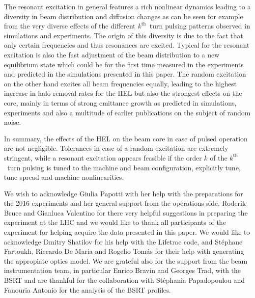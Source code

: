 \documentclass[%
 reprint,
 amsmath,amssymb,
 aps,
prstab,
]{revtex4-1}
\begin{document}
The resonant excitation in general features a rich nonlinear dynamics leading to a diversity in beam distribution and diffusion changes as can be seen for example from the very diverse effects of the different $k^{\mathrm{th}}$~turn pulsing patterns observed in simulations and experiments. The origin of this diversity is due to the fact that only certain frequencies and thus resonances are excited. Typical for the resonant excitation is also the fast adjustment of the beam distribution to a new equilibrium state which could be for the first time measured in the experiments and predicted in the simulations presented in this paper. The random excitation on the other hand excites all beam frequencies equally, leading to the highest increase in halo removal rates for the HEL \cite{hel_halo_hllhc_fitterer} but also the strongest effects on the core, mainly in terms of strong emittance growth as predicted in simulations, experiments and also a multitude of earlier publications on the subject of random noise.

In summary, the effects of the HEL on the beam core in case of pulsed operation are not negligible. Tolerances in case of a random excitation are extremely stringent, while a resonant excitation appears feasible if the order $k$ of the $k^{\mathrm{th}}$~turn pulsing is tuned to the machine and beam configuration, explicitly tune, tune spread and machine nonlinearities.

\begin{acknowledgments}
We wish to acknowledge Giulia Papotti with her help with the preparations for the 2016 experiments and her general support from the operations side, Roderik Bruce and Gianluca Valentino for there very helpful suggestions in preparing the experiment at the LHC and we would like to thank all participants of the experiment for helping acquire the data presented in this paper. We would like to acknowledge Dmitry Shatilov for his help with the Lifetrac code, and St\'{e}phane Fartoukh, Riccardo De Maria and Rogelio Tomás for their help with generating the appropiate optics model. We are grateful also for the support from the beam instrumentation team, in particular Enrico Bravin and Georges Trad, with the BSRT and are thankful for the collaboration with St\'{e}phania Papadopoulou and Fanouria Antonio for the analysis of the BSRT profiles.
\end{acknowledgments}

\newpage

\appendix
\end{document}
